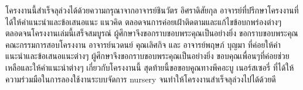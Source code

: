 \iffalse
\begin{dedication}
This document is dedicated to all Chiang Mai University students.

Dedication page is optional.
\end{dedication}
\fi %

\begin{acknowledgments}
โครงงานนี้สำเร็จลุล่วงได้ด้วยความกรุณาจากอาจารย์ชินวัตร อิศราดิสัยกุล อาจารย์ที่ปรึกษาโครงงานที่ได้ให้คำแนะนำและข้อเสนอแนะ แนวคิด ตลอดจนการค่อยเฝ้าติดตามและแก้ไขข้อบกพร่องต่างๆ ตลอดจนโครงงานเล่มนี้เสร็จสมบูรณ์
ผู้ศึกษาจึงขอกราบขอบพระคุณเป็นอย่างยิ่ง
ขอกราบขอบพระคุณคณะกรรมการสอบโครงงาน อาจารย์นวดนย์ คุณเลิศกิจ และ อาจารย์พฤษภ์ บุญมา ที่ค่อยให้คำแนะนำและข้อเสนอแนะต่างๆ ผู้ศึกษาจึงขอกราบขอบพระคุณเป็นอย่างยิ่ง
ขอบคุณเพื่อนๆที่ค่อยช่วยเหลือและให้คำแนะนำต่างๆ เกี่ยวกับโครงงานนี้
สุดท้ายนี้ขอขอบคูณทางพีคอะบู เนอร์สเซอรี่ ที่ได้ให้ความร่วมมือในการลองใช้งานระบบจัดการ nursery จนทำให้โครงงานสำเร็จลุล่วงไปได้ด้วยดี

\end{acknowledgments}%
\fi %

\contentspage

\ifproject
\figurelistpage

\fi %




